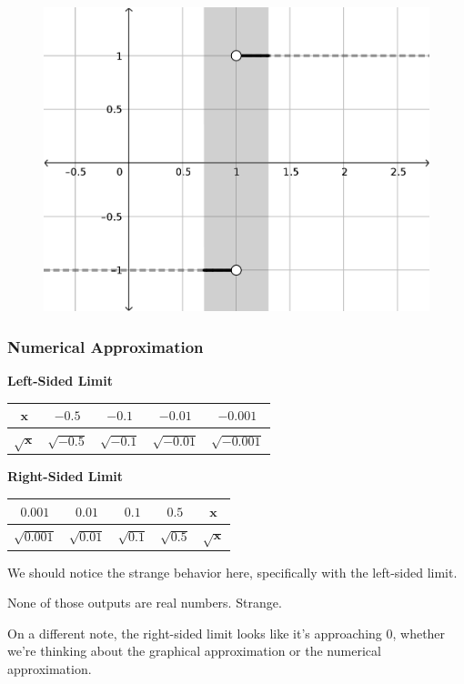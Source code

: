 \begin{figure}
  \includegraphics[scale=0.5]{./1_limits/images/1-2_graph3.png}
  \centering
\end{figure}



\subsubsection*{Numerical Approximation}

\textbf{Left-Sided Limit}

\begin{tabular}{ccccc} \toprule
  $\bm{x}$ & $-0.5$ & $-0.1$ & $-0.01$ & $-0.001$ \\ \midrule
  $\bm{\sqrt{x}}$ & $\sqrt{-0.5}$ & $\sqrt{-0.1}$ & $\sqrt{-0.01}$ & $\sqrt{-0.001}$\\ \bottomrule
\end{tabular}

\begin{flushright}
  \textbf{Right-Sided Limit}

  \begin{tabular}{ccccc} \toprule
    $0.001$ & $0.01$ & $0.1$ & $0.5$ & $\bm{x}$ \\ \midrule
    $\sqrt{0.001}$ & $\sqrt{0.01}$ & $\sqrt{0.1}$ & $\sqrt{0.5}$ & $\bm{\sqrt{x}}$ \\ \bottomrule
  \end{tabular}
\end{flushright}

We should notice the strange behavior here, specifically with the left-sided limit.

None of those outputs are real numbers.
Strange.

On a different note, the right-sided limit looks like it's approaching 0, whether we're thinking about the graphical approximation or the numerical approximation.
